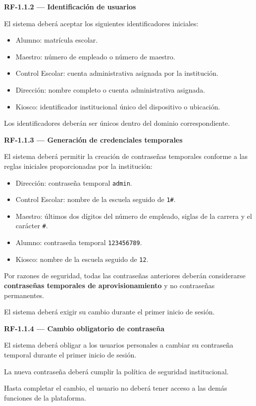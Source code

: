 \documentclass[12pt,a4paper]{article}
\newcommand{\RF}[1]{\textbf{\color{primary}RF-#1}}
\newenvironment{requisito}[1]
{
\begin{center}
\begin{minipage}{0.96\textwidth}
\colorbox{requirement}{
\begin{minipage}{0.94\textwidth}
\textbf{#1}
\end{minipage}
}
\vspace{2mm}
}
{
\end{minipage}
\end{center}
}
\begin{document}
\begin{requisito}{\RF{1.1.2} --- Identificación de usuarios}
El sistema deberá aceptar los siguientes identificadores iniciales:

\begin{itemize}[leftmargin=*]
\item Alumno: matrícula escolar.
\item Maestro: número de empleado o número de maestro.
\item Control Escolar: cuenta administrativa asignada por la institución.
\item Dirección: nombre completo o cuenta administrativa asignada.
\item Kiosco: identificador institucional único del dispositivo o ubicación.
\end{itemize}

Los identificadores deberán ser únicos dentro del dominio correspondiente.
\end{requisito}

\begin{requisito}{\RF{1.1.3} --- Generación de credenciales temporales}
El sistema deberá permitir la creación de contraseñas temporales conforme a las
reglas iniciales proporcionadas por la institución:

\begin{itemize}[leftmargin=*]
\item Dirección: contraseña temporal \texttt{admin}.
\item Control Escolar: nombre de la escuela seguido de \texttt{1#}.
\item Maestro: últimos dos dígitos del número de empleado, siglas de la carrera
y el carácter \texttt{#}.
\item Alumno: contraseña temporal \texttt{123456789}.
\item Kiosco: nombre de la escuela seguido de \texttt{12}.
\end{itemize}

Por razones de seguridad, todas las contraseñas anteriores deberán considerarse
\textbf{contraseñas temporales de aprovisionamiento} y no contraseñas permanentes.

El sistema deberá exigir su cambio durante el primer inicio de sesión.
\end{requisito}

\begin{requisito}{\RF{1.1.4} --- Cambio obligatorio de contraseña}
El sistema deberá obligar a los usuarios personales a cambiar su contraseña
temporal durante el primer inicio de sesión.

La nueva contraseña deberá cumplir la política de seguridad institucional.

Hasta completar el cambio, el usuario no deberá tener acceso a las demás
funciones de la plataforma.
\end{requisito}
\end{document}
